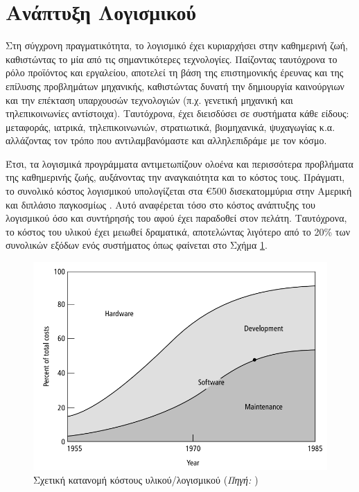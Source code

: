 \section{Ανάπτυξη Λογισμικού}
\label{sec:soft_dev}

Στη σύγχρονη πραγματικότητα, το λογισμικό έχει κυριαρχήσει στην καθημερινή ζωή, καθιστώντας το μία από τις σημαντικότερες τεχνολογίες. Παίζοντας ταυτόχρονα το ρόλο προϊόντος και εργαλείου, αποτελεί τη βάση της επιστημονικής έρευνας και της επίλυσης προβλημάτων μηχανικής, καθιστώντας δυνατή την δημιουργία καινούργιων και την επέκταση υπαρχουσών τεχνολογιών (π.χ. γενετική μηχανική και τηλεπικοινωνίες αντίστοιχα). Ταυτόχρονα, έχει διεισδύσει σε συστήματα κάθε είδους: μεταφοράς, ιατρικά, τηλεπικοινωνιών, στρατιωτικά, βιομηχανικά, ψυχαγωγίας κ.α. αλλάζοντας τον τρόπο που αντιλαμβανόμαστε και αλληλεπιδράμε με τον κόσμο.

Έτσι, τα λογισμικά προγράμματα αντιμετωπίζουν ολοένα και περισσότερα προβλήματα της καθημερινής ζωής, αυξάνοντας την αναγκαιότητα και το κόστος τους. Πράγματι, το συνολικό κόστος λογισμικού υπολογίζεται στα \euro500 δισεκατομμύρια στην Αμερική και διπλάσιο παγκοσμίως \cite{software_engineering_principles}. Αυτό αναφέρεται τόσο στο κόστος ανάπτυξης του λογισμικού όσο και συντήρησής του αφού έχει παραδοθεί στον πελάτη. Ταυτόχρονα, το κόστος του υλικού έχει μειωθεί δραματικά, αποτελώντας λιγότερο από το 20\% των συνολικών εξόδων ενός συστήματος όπως φαίνεται στο Σχήμα \ref{fig:hardware_software_costs}.

\begin{figure}[h]
    \centering
    \includegraphics[scale=2.2]{images/chapter2/software_engineering/hardware_software_costs.png}
    \caption{Σχετική κατανομή κόστους υλικού/λογισμικού (\textsl{Πηγή: \cite{hardware_software_costs}}) }
    \label{fig:hardware_software_costs}
\end{figure}

